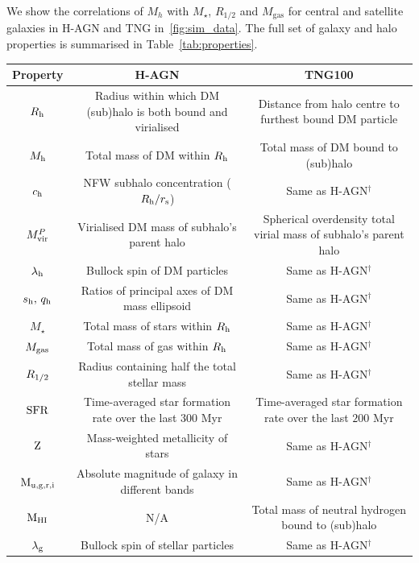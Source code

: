 \documentclass[useAMS,usenatbib]{mnras}
\begin{document}
\vspace{3mm}

\noindent We show the correlations of $M_h$ with $M_\star$, $R_{1/2}$ and $M_\text{gas}$ for central and satellite galaxies in H-AGN and TNG in~\cref{fig:sim_data}. The full set of galaxy and halo properties is summarised in Table~\ref{tab:properties}.

\begin{table}
    \centering
    \begin{tabular}{ccc}
        Property & H-AGN & TNG100 \\
        \hline
        \hline
        $R_{\rm h}$ & Radius within which \ac{DM} (sub)halo is both bound and virialised & Distance from halo centre to furthest bound \ac{DM} particle\\
        $M_{\rm h}$ & Total mass of \ac{DM} within $R_{\rm h}$ & Total mass of \ac{DM} bound to (sub)halo\\
        $c_{\rm h}$ & NFW subhalo concentration ($R_{\rm h}/r_{\rm s}$) & Same as H-AGN$^\dagger$\\
        $M_{\rm vir}^P$ & Virialised DM mass of subhalo's parent halo & Spherical overdensity total virial mass of subhalo's parent halo\\
        $\lambda_{\rm h}$ & Bullock spin of \ac{DM} particles & Same as H-AGN$^\dagger$\\
        $s_{\rm h},\,q_{\rm h}$ & Ratios of principal axes of \ac{DM} mass ellipsoid & Same as H-AGN$^\dagger$\\
        \hline
        $M_{\star}$ & Total mass of stars within $R_{\rm h}$ & Same as H-AGN$^\dagger$\\
        $M_{\rm gas}$ & Total mass of gas within $R_{\rm h}$ & Same as H-AGN$^\dagger$\\
        $R_{\rm 1/2}$ & Radius containing half the total stellar mass & Same as H-AGN$^\dagger$\\
        $\rm SFR$ & Time-averaged star formation rate over the last $300$ Myr & Time-averaged star formation rate over the last $200$ Myr\\
        $\rm Z$ & Mass-weighted metallicity of stars & Same as H-AGN$^\dagger$\\
        $\rm M_{u, g, r, i}$ & Absolute magnitude of galaxy in different bands & Same as H-AGN$^\dagger$\\
        $\rm M_{\rm HI}$ & N/A & Total mass of neutral hydrogen bound to (sub)halo\\
        $\lambda_{\rm g}$ & Bullock spin of stellar particles & Same as H-AGN$^\dagger$\\

\end{tabular}
\end{table}
\end{document}
